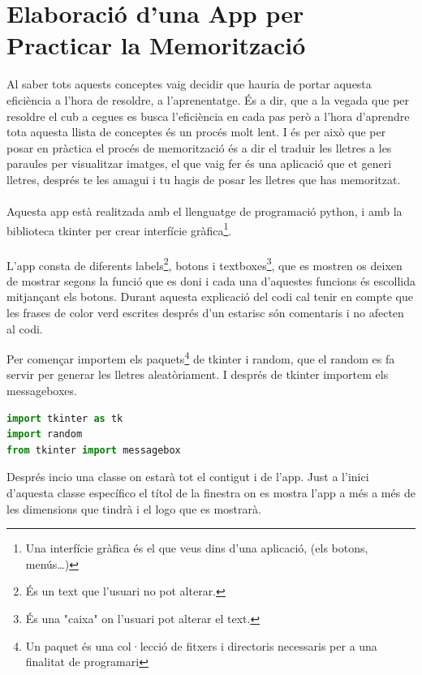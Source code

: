 \chapter{Elaboració d'una App per Practicar la Memorització}
\label{cha:python}

Al saber tots aquests conceptes vaig decidir que hauria de portar aquesta eficiència a l'hora de resoldre, a l'aprenentatge. És a dir, que a la vegada que per resoldre el cub a cegues es busca l'eficiència en cada pas però a l'hora d'aprendre tota aquesta llista de conceptes és un procés molt lent.
I és per això que per posar en pràctica el procés de memorització és a dir el traduir les lletres a les paraules per visualitzar imatges, el que vaig fer és una aplicació que et generi lletres, després te les amagui i tu hagis de posar les lletres que has memoritzat.
\\\\Aquesta app està realitzada amb el llenguatge de programació python, i amb la biblioteca tkinter per crear interfície gràfica\footnote{Una interfície gràfica és el que veus dins d'una aplicació, (els botons, menús\dots)}.
\\\\L'app consta de diferents labels\footnote{És un text que l'usuari no pot alterar.}, botons i textboxes\footnote{És una "caixa" on l'usuari pot alterar el text.}, que es mostren os deixen de mostrar segons la funció que es doni i cada una d'aquestes funcions és escollida mitjançant els botons. Durant aquesta explicació del codi cal tenir en compte que les frases de color verd escrites després d'un estarisc són comentaris i no afecten al codi.

\vspace{0.5cm}

Per començar importem els paquets\footnote{Un paquet és una col·lecció de fitxers i directoris necessaris per a una finalitat de programari} de tkinter i random, que el random es fa servir per generar les lletres aleatòriament. I després de tkinter importem els messageboxes.

\begin{lstlisting}[language=Python, style=colorEX, caption=Importació de paquets]
import tkinter as tk
import random
from tkinter import messagebox
\end{lstlisting}

Després incio una classe on estarà tot el contigut i de l'app. Just a l'inici d'aquesta classe específico el títol de la finestra on es mostra l'app a més a més de les dimensions que tindrà i el logo que es mostrarà. 

